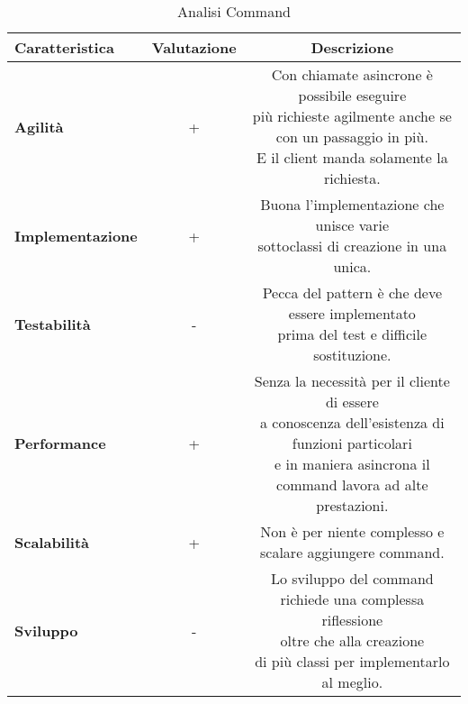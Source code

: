 {{{\begin{itemize}
				\small %
				{\renewcommand\arraystretch{1.2} %
					\begin{center} \begin{table} \begin{tabular}{|l|c|c|}
						\hline
						{\textbf{Caratteristica}}&{\textbf{Valutazione}}&{\textbf{Descrizione}}\\
						\hline
						\textbf{Agilità} & + &  \minitab[c]{Con chiamate asincrone è possibile eseguire\\più richieste agilmente anche se con un passaggio in più.\\E il client manda solamente la richiesta.} \\
						\hline
						\textbf{Implementazione} & + &  \minitab[c]{Buona l'implementazione che unisce varie\\sottoclassi di creazione in una unica.}\\
						\hline
						\textbf{Testabilità} & - &  \minitab[c]{Pecca del pattern è che deve essere implementato\\prima del test e difficile sostituzione.}\\
						\hline
						\textbf{Performance} & + &   \minitab[c]{Senza la necessità per il cliente di essere\\a conoscenza dell'esistenza di funzioni particolari\\e in maniera asincrona il command lavora ad alte prestazioni.} \\
						\hline
						\textbf{Scalabilità} & + &  Non è per niente complesso e scalare aggiungere command. \\
						\hline
						\textbf{Sviluppo} & - &  \minitab[c]{Lo sviluppo del command richiede una complessa riflessione\\ oltre che alla creazione\\di più classi per implementarlo al meglio.}\\
						\hline
					\end{tabular}
				\caption{Analisi Command}
				\label{ACo}
			\end{table}	
			 \end{center}
				}
			\end{itemize}
		}
	}
}